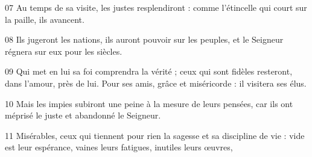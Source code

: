 
07 Au temps de sa visite, les justes resplendiront : comme l’étincelle qui court sur la paille, ils avancent.

08 Ils jugeront les nations, ils auront pouvoir sur les peuples, et le Seigneur régnera sur eux pour les siècles.

09 Qui met en lui sa foi comprendra la vérité ; ceux qui sont fidèles resteront, dans l’amour, près de lui. Pour ses amis, grâce et miséricorde : il visitera ses élus.

10 Mais les impies subiront une peine à la mesure de leurs pensées, car ils ont méprisé le juste et abandonné le Seigneur.

11 Misérables, ceux qui tiennent pour rien la sagesse et sa discipline de vie : vide est leur espérance, vaines leurs fatigues, inutiles leurs œuvres,